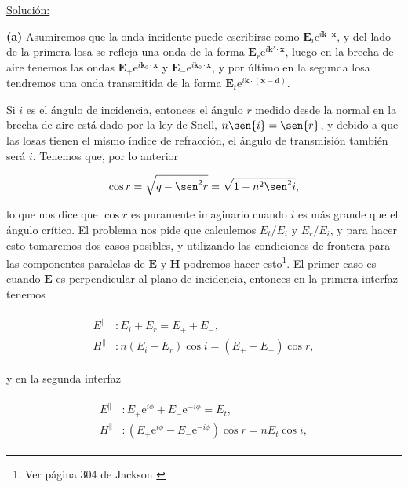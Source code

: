 \documentclass[a4paper,11pt]{article}
\numberwithin{equation}{section}
\newcommand{\euler}{\mathrm{e}}
\begin{document}
\vspace{.3cm}

\underline{Solución:} \vspace{.3cm}

\textbf{(a)} Asumiremos que la onda incidente puede escribirse como $\mathbf{E}_i 
\euler^{i\mathbf{k}\cdot \mathbf{x}}$, y del lado de la primera losa se refleja 
una onda de la forma  $\mathbf{E}_r \euler^{i\mathbf{k'}\cdot \mathbf{x}}$, luego 
en la brecha de aire tenemos las ondas  $\mathbf{E}_+
\euler^{i\mathbf{k}_0\cdot \mathbf{x}}$ y  $\mathbf{E}_- 
\euler^{i\mathbf{k}_0\cdot \mathbf{x}}$, y por último en la segunda losa tendremos 
una onda transmitida de la forma  $\mathbf{E}_t 
\euler^{i\mathbf{k}\cdot (\mathbf{x} - \mathbf{d})}$.

\vspace{.3cm}

Si $i$ es el ángulo de incidencia, entonces el ángulo $r$ medido desde la normal 
en la brecha de aire  está dado por la ley de Snell, $n \sen{i} = \sen{r}$, y
debido a que las losas  tienen el mismo índice de refracción, el ángulo de
transmisión también será $i$. Tenemos que, por lo anterior

\begin{equation}
 \cos{r} = \sqrt{q - \sen^2{r}} = \sqrt{1 - n^2\sen^2{i}},
\end{equation}

lo que nos dice que $\cos{r}$ es puramente imaginario cuando $i$ es más grande 
que el ángulo crítico. El problema nos pide que calculemos $E_t/E_i$ y $E_r/E_i$, 
y para hacer esto tomaremos dos casos posibles, y utilizando las condiciones 
de frontera para las componentes paralelas de $\mathbf{E}$ y $\mathbf{H}$ podremos hacer
esto\footnote{Ver página 304 de Jackson \cite{jackson}}. El primer caso es 
cuando $\mathbf{E}$ es perpendicular al plano de incidencia, entonces en la
primera interfaz tenemos 

\begin{align}
  \begin{split}
  E^{\parallel} &: E_i + E_r = E_+ + E_-, \\
  H^{\parallel} &: n(E_i - E_r)\cos{i} = (E_+ - E_-)\cos{r},
  \end{split}
\end{align}

y en la segunda interfaz 

\begin{align}
  \begin{split}
  E^{\parallel} &: E_+\euler^{i\phi} + E_-\euler^{-i\phi} = E_t, \\
  H^{\parallel} &: (E_+\euler^{i\phi} - E_-\euler^{-i\phi})\cos{r} =
  nE_t \cos{i},
  \end{split}
\end{align}
\end{document}
